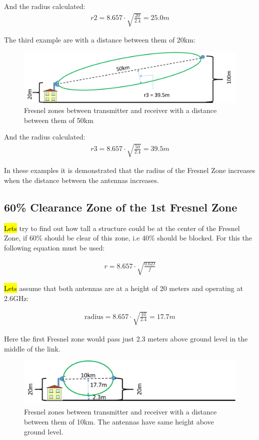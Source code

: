 \noindent And the radius calculated:
\begin{align*}
r2 = 8.657\cdot \sqrt{\frac{20}{2.4}} = 25.0m
\end{align*}

\noindent The third example are with a distance between them of 20km:

\begin{figure}[H]
	\centering
	\includegraphics[scale=0.50]{figures/fresnel_50km.png}
	\caption{Fresnel zones between transmitter and receiver with a distance between them of 50km}
	\label{fig:fresnel_zones_50km}
\end{figure}  

\noindent And the radius calculated:
\begin{align*}
r3 = 8.657\cdot \sqrt{\frac{50}{2.4}} = 39.5m
\end{align*}

\noindent In these examples it is demonstrated that the radius of the Fresnel Zone increases when the distance between the antennas increases.

\subsection{60\% Clearance Zone of the 1st Fresnel Zone}
\hl{Lets} try to find out how tall a structure could be at the center of the Fresnel Zone, if 60\% should be clear of this zone, i.e 40\% should be blocked. For this the following equation must be used:

\begin{align*}
r = 8.657\cdot \sqrt{\frac{0.6D}{f}}
\end{align*}

\hl{Lets} assume that both antennas are at a height of 20 meters and operating at 2.6GHz:

\begin{align*}
\text{radius} = 8.657\cdot \sqrt{\frac{10}{2.4}} = 17.7m
\end{align*}

Here the first Fresnel zone would pass just 2.3 meters above ground level in the middle of the link. 

\begin{figure}[H]
	\centering
	\includegraphics[scale=0.50]{figures/fresnel_10km_height.png}
	\caption{Fresnel zones between transmitter and receiver  with a distance between them of 10km. The antennas have same height above ground level.}
	\label{fig:fresnel_zones_10km_height}
\end{figure}  

